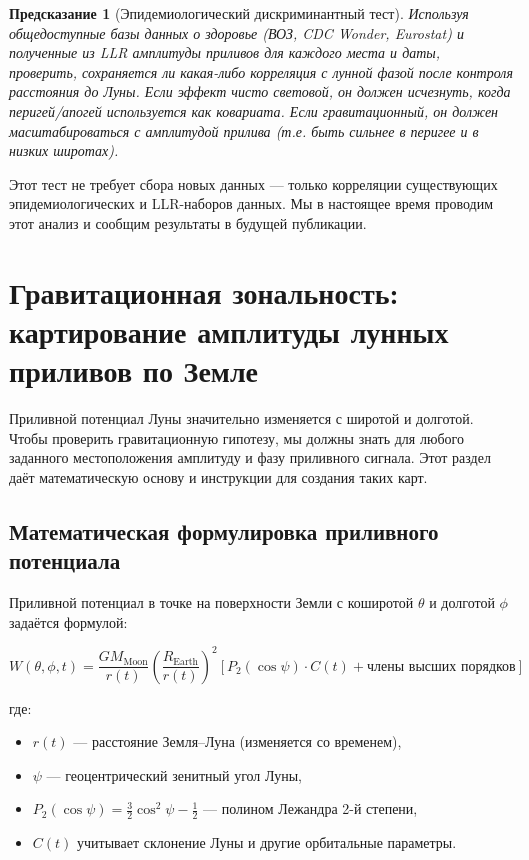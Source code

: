 \documentclass[12pt,a4paper]{article}
\newtheorem{prediction}[theorem]{Предсказание}
\theoremstyle{remark}
\begin{document}
	\begin{prediction}[Эпидемиологический дискриминантный тест]
		Используя общедоступные базы данных о здоровье (ВОЗ, CDC Wonder, Eurostat) и полученные из LLR амплитуды приливов для каждого места и даты, проверить, сохраняется ли какая-либо корреляция с лунной фазой после контроля расстояния до Луны. Если эффект чисто световой, он должен исчезнуть, когда перигей/апогей используется как ковариата. Если гравитационный, он должен масштабироваться с амплитудой прилива (т.е. быть сильнее в перигее и в низких широтах).
	\end{prediction}
	
	Этот тест не требует сбора новых данных — только корреляции существующих эпидемиологических и LLR-наборов данных. Мы в настоящее время проводим этот анализ и сообщим результаты в будущей публикации.
	
	\section{Гравитационная зональность: картирование амплитуды лунных приливов по Земле}
	\label{sec:map}
	
	Приливной потенциал Луны значительно изменяется с широтой и долготой. Чтобы проверить гравитационную гипотезу, мы должны знать для любого заданного местоположения амплитуду и фазу приливного сигнала. Этот раздел даёт математическую основу и инструкции для создания таких карт.
	
	\subsection{Математическая формулировка приливного потенциала}
	
	Приливной потенциал в точке на поверхности Земли с коширотой \(\theta\) и долготой \(\phi\) задаётся формулой:
	
	\begin{equation}
		W(\theta, \phi, t) = \frac{GM_{\text{Moon}}}{r(t)} \left(\frac{R_{\text{Earth}}}{r(t)}\right)^2 \left[ P_2(\cos\psi) \cdot C(t) + \text{члены высших порядков} \right]
		\label{eq:tidal-full-map}
	\end{equation}
	
	где:
	\begin{itemize}
		\item \(r(t)\) — расстояние Земля–Луна (изменяется со временем),
		\item \(\psi\) — геоцентрический зенитный угол Луны,
		\item \(P_2(\cos\psi) = \frac{3}{2}\cos^2\psi - \frac{1}{2}\) — полином Лежандра 2-й степени,
		\item \(C(t)\) учитывает склонение Луны и другие орбитальные параметры.
	\end{itemize}
	
\end{document}
